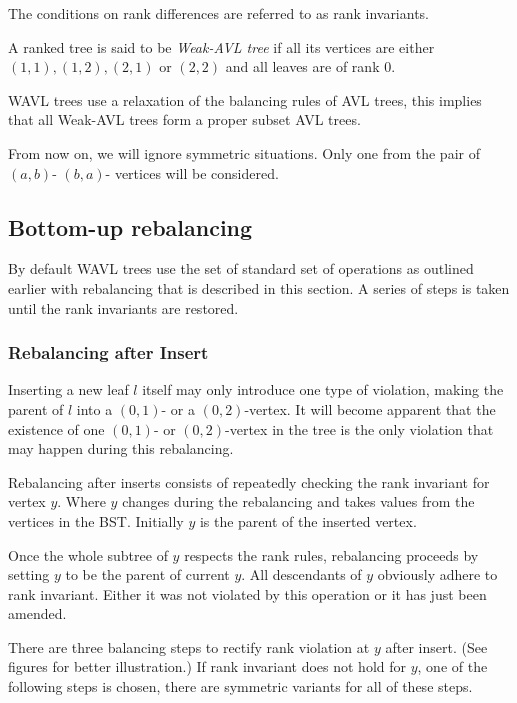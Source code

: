The conditions on rank differences are referred to as rank invariants.

\begin{defn}
A ranked tree is said to be {\em Weak-AVL tree} if all its vertices are either $(1,1), (1,2), (2,1)$ or $(2,2)$ and all leaves are of rank $0$.
\end{defn}

WAVL trees use a relaxation of the balancing rules of AVL trees, this implies that all Weak-AVL trees form a proper subset AVL trees.

From now on, we will ignore symmetric situations. Only one from the pair of $(a,b)$- $(b,a)$- vertices will be considered.

\subsection{Bottom-up rebalancing}

By default WAVL trees use the set of standard set of operations as outlined earlier with rebalancing that is described in this section. A series of steps is taken until the rank invariants are restored.


\subsubsection*{Rebalancing after Insert}

Inserting a new leaf $l$ itself may only introduce one type of violation, making the parent of $l$ into a $(0,1)$- or a $(0,2)$-vertex. It will become apparent that the existence of one $(0,1)$- or $(0,2)$-vertex in the tree is the only violation that may happen during this rebalancing. 

Rebalancing after inserts consists of repeatedly checking the rank invariant for vertex $y$. Where $y$ changes during the rebalancing and takes values from the vertices in the BST. Initially $y$ is the parent of the inserted vertex. 

Once the whole subtree of $y$ respects the rank rules, rebalancing proceeds by setting $y$ to be the parent of current $y$. All descendants of $y$ obviously adhere to rank invariant. Either it was not violated by this operation or it has just been amended. 

There are three balancing steps to rectify rank violation at $y$ after insert. (See figures for better illustration.) If rank invariant does not hold for $y$, one of the following steps is chosen, there are symmetric variants for all of these steps. 

